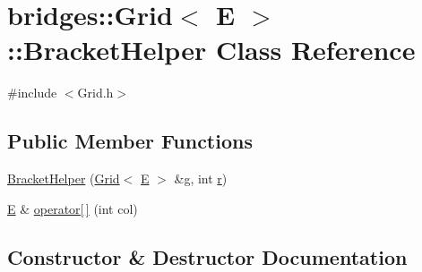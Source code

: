 \hypertarget{classbridges_1_1_grid_1_1_bracket_helper}{}\section{bridges\+::Grid$<$ E $>$\+::Bracket\+Helper Class Reference}
\label{classbridges_1_1_grid_1_1_bracket_helper}


{\ttfamily \#include $<$Grid.\+h$>$}

\subsection*{Public Member Functions}
\begin{DoxyCompactItemize}
\item 
\mbox{\hyperlink{classbridges_1_1_grid_1_1_bracket_helper_a79d3a120c42bb844ec95fe67aca36847}{Bracket\+Helper}} (\mbox{\hyperlink{classbridges_1_1_grid}{Grid}}$<$ \mbox{\hyperlink{namespacebridges_acfb0a4f7877d8f63de3e6862004c50eda3a3ea00cfc35332cedf6e5e9a32e94da}{E}} $>$ \&\mbox{\hyperlink{namespacebridges_acfb0a4f7877d8f63de3e6862004c50edab2f5ff47436671b6e533d8dc3614845d}{g}}, int \mbox{\hyperlink{namespacebridges_acfb0a4f7877d8f63de3e6862004c50eda4b43b0aee35624cd95b910189b3dc231}{r}})
\item 
\mbox{\hyperlink{namespacebridges_acfb0a4f7877d8f63de3e6862004c50eda3a3ea00cfc35332cedf6e5e9a32e94da}{E}} \& \mbox{\hyperlink{classbridges_1_1_grid_1_1_bracket_helper_ad8055b8dd94d6988d8143ab7cf7d3386}{operator\mbox{[}$\,$\mbox{]}}} (int col)
\end{DoxyCompactItemize}


\subsection{Constructor \& Destructor Documentation}
\mbox{\label{classbridges_1_1_grid_1_1_bracket_helper_a79d3a120c42bb844ec95fe67aca36847}} 
